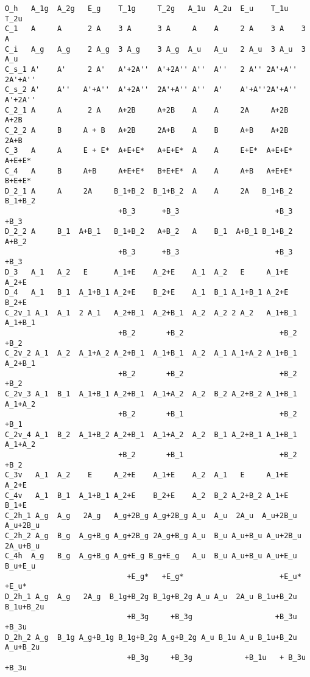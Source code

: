 \documentclass[12pt,a4paper,twoside]{report}
\begin{document}
\begin{tcolorbox}
\begin{scriptsize}
\begin{verbatim}
O_h   A_1g  A_2g   E_g    T_1g     T_2g   A_1u  A_2u  E_u    T_1u   T_2u
C_1   A     A      2 A    3 A      3 A     A    A     2 A    3 A    3 A
C_i   A_g   A_g    2 A_g  3 A_g    3 A_g  A_u   A_u   2 A_u  3 A_u  3 A_u
C_s_1 A'    A'     2 A'   A'+2A''  A'+2A'' A''  A''   2 A'' 2A'+A'' 2A'+A''
C_s_2 A'    A''   A'+A''  A'+2A''  2A'+A'' A''  A'    A'+A''2A'+A'' A'+2A''
C_2_1 A     A      2 A    A+2B     A+2B    A    A     2A     A+2B   A+2B   
C_2_2 A     B     A + B   A+2B     2A+B    A    B     A+B    A+2B   2A+B
C_3   A     A     E + E*  A+E+E*   A+E+E*  A    A     E+E*  A+E+E*  A+E+E*
C_4   A     B     A+B     A+E+E*   B+E+E*  A    A     A+B   A+E+E*  B+E+E*
D_2_1 A     A     2A     B_1+B_2  B_1+B_2  A    A     2A   B_1+B_2  B_1+B_2
                          +B_3      +B_3                      +B_3     +B_3
D_2_2 A     B_1  A+B_1   B_1+B_2   A+B_2   A    B_1  A+B_1 B_1+B_2  A+B_2
                          +B_3      +B_3                      +B_3   +B_3
D_3   A_1   A_2   E      A_1+E    A_2+E    A_1  A_2   E     A_1+E   A_2+E
D_4   A_1   B_1  A_1+B_1 A_2+E    B_2+E    A_1  B_1 A_1+B_1 A_2+E   B_2+E
C_2v_1 A_1  A_1  2 A_1   A_2+B_1  A_2+B_1  A_2  A_2 2 A_2   A_1+B_1 A_1+B_1
                          +B_2       +B_2                      +B_2    +B_2
C_2v_2 A_1  A_2  A_1+A_2 A_2+B_1  A_1+B_1  A_2  A_1 A_1+A_2 A_1+B_1 A_2+B_1
                          +B_2       +B_2                      +B_2    +B_2
C_2v_3 A_1  B_1  A_1+B_1 A_2+B_1  A_1+A_2  A_2  B_2 A_2+B_2 A_1+B_1 A_1+A_2
                          +B_2       +B_1                      +B_2    +B_1
C_2v_4 A_1  B_2  A_1+B_2 A_2+B_1  A_1+A_2  A_2  B_1 A_2+B_1 A_1+B_1 A_1+A_2
                          +B_2       +B_1                      +B_2    +B_2
C_3v   A_1  A_2    E     A_2+E    A_1+E    A_2  A_1   E     A_1+E   A_2+E
C_4v   A_1  B_1  A_1+B_1 A_2+E    B_2+E    A_2  B_2 A_2+B_2 A_1+E   B_1+E
C_2h_1 A_g  A_g   2A_g   A_g+2B_g A_g+2B_g A_u  A_u  2A_u  A_u+2B_u A_u+2B_u
C_2h_2 A_g  B_g  A_g+B_g A_g+2B_g 2A_g+B_g A_u  B_u A_u+B_u A_u+2B_u 2A_u+B_u
C_4h  A_g   B_g  A_g+B_g A_g+E_g B_g+E_g   A_u  B_u A_u+B_u A_u+E_u B_u+E_u
                            +E_g*   +E_g*                      +E_u*   +E_u*
D_2h_1 A_g  A_g   2A_g  B_1g+B_2g B_1g+B_2g A_u A_u  2A_u B_1u+B_2u B_1u+B_2u
                            +B_3g     +B_3g                   +B_3u     +B_3u
D_2h_2 A_g  B_1g A_g+B_1g B_1g+B_2g A_g+B_2g A_u B_1u A_u B_1u+B_2u A_u+B_2u
                            +B_3g     +B_3g            +B_1u   + B_3u  +B_3u

\end{verbatim}
\end{scriptsize}
\end{tcolorbox}
\end{document}
